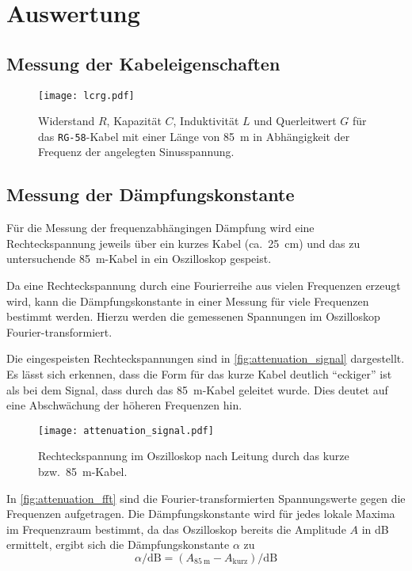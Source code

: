 \section{Auswertung}
\label{sec:Auswertung}

\subsection{Messung der Kabeleigenschaften}

\begin{figure}
  \centering
  \texttt{[image: lcrg.pdf]}
  \caption{Widerstand $R$, Kapazität $C$, Induktivität $L$ und Querleitwert $G$ für das \texttt{RG-58}-Kabel mit einer Länge von \SI{85}{\meter} in Abhängigkeit der Frequenz der angelegten Sinusspannung.}
  \label{fig:lcrg}
\end{figure}


\subsection{Messung der Dämpfungskonstante}

Für die Messung der frequenzabhängingen Dämpfung wird eine Rechteckspannung
jeweils über ein kurzes Kabel (ca.\ \SI{25}{\centi\meter}) und das zu untersuchende \SI{85}{\meter}-Kabel in ein Oszilloskop gespeist.

Da eine Rechteckspannung durch eine Fourierreihe aus vielen Frequenzen erzeugt wird,
kann die Dämpfungskonstante in einer Messung für viele Frequenzen bestimmt werden.
Hierzu werden die gemessenen Spannungen im Oszilloskop Fourier-transformiert.

Die eingespeisten Rechteckspannungen sind in \autoref{fig:attenuation_signal} dargestellt.
Es lässt sich erkennen, dass die Form für das kurze Kabel deutlich \enquote{eckiger} ist als bei dem Signal, dass durch das \SI{85}{\meter}-Kabel geleitet wurde.
Dies deutet auf eine Abschwächung der höheren Frequenzen hin.

\begin{figure}
  \centering
  \texttt{[image: attenuation\_signal.pdf]}
  \caption{%
    Rechteckspannung im Oszilloskop nach Leitung durch das kurze bzw.\ \SI{85}{\meter}-Kabel.%
  }\label{fig:attenuation_signal}
\end{figure}

In \autoref{fig:attenuation_fft} sind die Fourier-transformierten Spannungswerte gegen die Frequenzen aufgetragen.
Die Dämpfungskonstante wird für jedes lokale Maxima im Frequenzraum bestimmt,
da das Oszilloskop bereits die Amplitude $A$ in \si{\deci\bel} ermittelt, ergibt sich die Dämpfungskonstante $α$ zu
\begin{equation}
  α / \si{\deci\bel} = (A_{\SI{85}{\meter}} - A_\text{kurz}) / \si{\deci\bel}
\end{equation}

